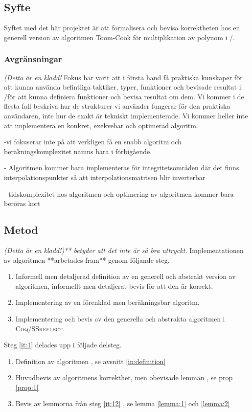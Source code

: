 \subsection{Syfte}
Syftet med det här projektet är att formalisera och bevisa korrektheten hos en
generell version av algoritmen Toom-Cook för multiplikation av polynom i \coq/\ssr.

\subsubsection{Avgränsningar}
\emph{(Detta är en kladd!}
Fokus har varit att i första hand få praktiska kunskaper för att kunna använda befintliga
taktiker, typer, funktioner och bevisade resultat i \coq/\ssr för att kunna definiera funktioner och
bevisa resultat om dem. Vi kommer i de flesta fall beskriva hur
de strukturer vi använder fungerar för den praktiska användaren, inte hur de exakt är tekniskt implementerade.
Vi kommer heller inte att implementera en konkret, exekvebar och optimerad algoritm.

-vi fokuserar inte på att verkligen få en snabb algoritm och beräkningskomplexitet nämns bara i förbigående.

- Algoritmen kommer bara implementeras för integritetsområden där det finns interpolationspunkter så att
  interpolationsmatrisen blir inverterbar

- tidskomplexitet hos algoritmen och optimering av algoritmen kommer bara beröras kort

\subsection{Metod}
\emph{(Detta är en kladd!)** betyder att det inte är så bra uttryckt.}
Implementationen av algoritmen **arbetades fram** genom följande steg.
\begin{enumerate}
\item Informell men detaljerad definition av en generell och abstrakt version av algoritmen,
informellt men detaljerat bevis för att den är korrekt. \label{it:1}
\item Implementering av en förenklad men beräkningsbar algoritm. \label{it:2}
\item Implementering och bevis av den generella och abstrakta algoritmen i \textsc{Coq/SSreflect}.\label{it:3}
\end{enumerate}
Steg \ref{it:1} delades upp i följade delsteg.
\begin{enumerate}
 \item Definition av algoritmen \label{it:11}, se avsnitt \ref{in:definition}
 \item Huvudbevis av algoritmens korrekthet, men obevisade lemman \label{it:12}, se prop \ref{prop:1}
 \item Bevis av lemmorna från steg \ref{it:12} \label{it:13}, se lemma \ref{lemma:1} och \ref{lemma:2}
\end{enumerate}

